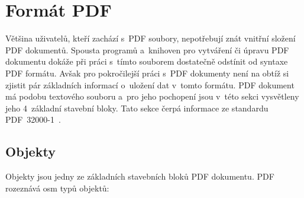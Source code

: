 \section{Formát PDF} \label{format_PDF}
Většina uživatelů, kteří zachází s~PDF soubory, nepotřebují znát vnitřní složení
PDF dokumentů. Spousta programů a~knihoven pro vytváření či úpravu PDF dokumentu
dokáže při práci s~tímto souborem dostatečně odstínit od syntaxe PDF formátu.
Avšak pro pokročilejší práci s~PDF dokumenty není na obtíž si zjistit pár
základních informací o~uložení dat v~tomto formátu.
PDF dokument má podobu textového souboru a~pro jeho pochopení jsou v~této sekci
vysvětleny jeho 4~základní stavební bloky. Tato sekce čerpá informace ze
standardu PDF~32000-1~\cite[k.~7, s.~11--109]{PDF32000-1:2008}.


\subsection*{Objekty}
Objekty jsou jedny ze základních stavebních bloků PDF dokumentu. PDF rozeznává
osm typů objektů:
